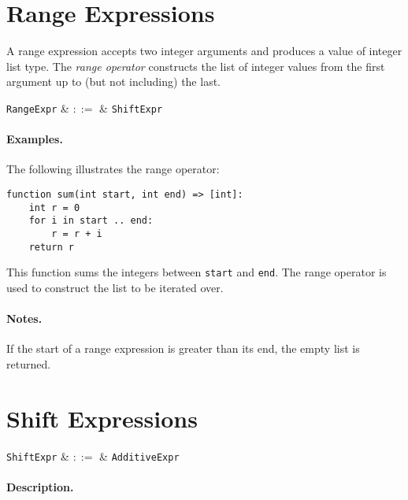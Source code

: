 \section{Range Expressions}
\label{c_expr_range}

A range expression accepts two integer arguments and produces a value of integer list type.  The {\em range operator} constructs the list of integer values from the first argument up to (but not including) the last.

\begin{syntax}
  \verb+RangeExpr+ & $::=$ & \verb+ShiftExpr+\ \\
\end{syntax}

\paragraph{Examples.}  The following illustrates the range operator:

\begin{lstlisting}
function sum(int start, int end) => [int]:
    int r = 0
    for i in start .. end:
        r = r + i
    return r
\end{lstlisting}

This function sums the integers between \lstinline{start} and \lstinline{end}.  The range operator is used to construct the list to be iterated over.

\paragraph{Notes.}  If the start of a range expression is greater than its end, the empty list is returned.


\section{Shift Expressions}
\label{c_expr_shift}

\begin{syntax}
  \verb+ShiftExpr+ & $::=$ & \verb+AdditiveExpr+\ 
\end{syntax}

\paragraph{Description.}

